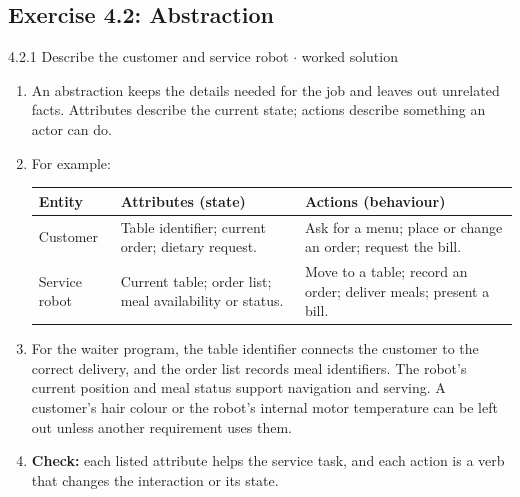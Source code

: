 \documentclass[11pt]{article}
\begin{document}
\begin{keepsection}\subsection{Exercise 4.2: Abstraction}

\begin{workedbox}{4.2.1 Describe the customer and service robot \ensuremath{\cdot} worked solution}
\begin{enumerate}
\item An abstraction keeps the details needed for the job and leaves out unrelated facts. Attributes describe the current state; actions describe something an actor can do.
\item {}
For example:

\begin{center}\small\begin{tabularx}{\linewidth}{>{\raggedright\arraybackslash}X>{\raggedright\arraybackslash}X>{\raggedright\arraybackslash}X}\toprule
\textbf{Entity} & \textbf{Attributes (state)} & \textbf{Actions (behaviour)} \\ \midrule
Customer & Table identifier; current order; dietary request. & Ask for a menu; place or change an order; request the bill. \\
Service robot & Current table; order list; meal availability or status. & Move to a table; record an order; deliver meals; present a bill. \\
\bottomrule\end{tabularx}\end{center}
\item For the waiter program, the table identifier connects the customer to the correct delivery, and the order list records meal identifiers. The robot's current position and meal status support navigation and serving. A customer's hair colour or the robot's internal motor temperature can be left out unless another requirement uses them.
\item \textbf{Check:} each listed attribute helps the service task, and each action is a verb that changes the interaction or its state.
\end{enumerate}
\end{workedbox}

\end{keepsection}
\end{document}
